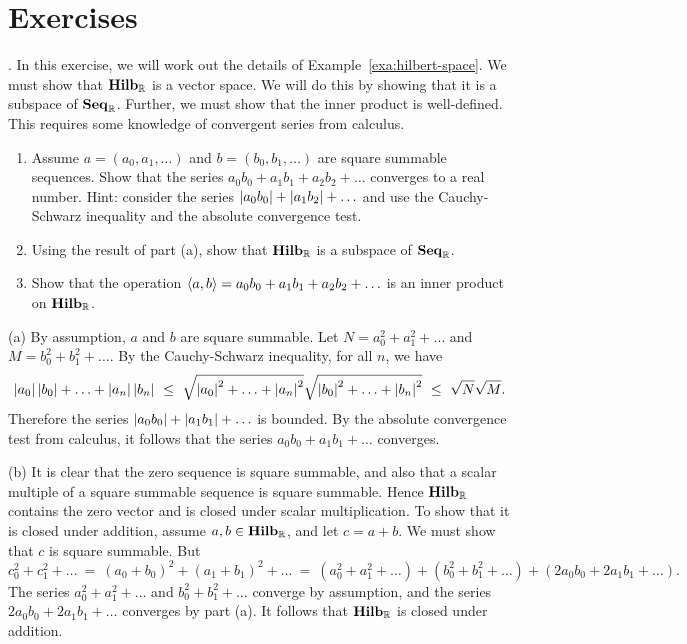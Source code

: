 \section*{Exercises}

\begin{ex}\label{ex:hilbert-space}.
  In this exercise, we will work out the details of
  Example~\ref{exa:hilbert-space}. We must show that $\mathbf{Hilb}_{\mathbb{R}}$ is a
  vector space. We will do this by showing that it is a subspace of
  $\mathbf{Seq}_{\mathbb{R}}$. Further, we must show that the inner product is
  well-defined. This requires some knowledge of convergent series from
  calculus.
  \begin{enumerate}
  \item Assume $a=(a_0,a_1,\ldots)$ and $b=(b_0,b_1,\ldots)$ are
    square summable sequences. Show that the series
    $a_0b_0 + a_1b_1 + a_2b_2 + \ldots$ converges to a real
    number. Hint: consider the series
    $\left|a_0b_0\right| + \left|a_1b_2\right| + \ldots$ and use the Cauchy-Schwarz
    inequality and the absolute convergence test.
  \item Using the result of part (a), show that $\mathbf{Hilb}_{\mathbb{R}}$ is a
    subspace of $\mathbf{Seq}_{\mathbb{R}}$. 
  \item Show that the operation $\langle a,b\rangle = a_0b_0 + a_1b_1 +
    a_2b_2 + \ldots$ is an inner product on $\mathbf{Hilb}_{\mathbb{R}}$.
  \end{enumerate}
  \begin{sol}
    (a) By assumption, $a$ and $b$ are square summable. Let
    $N=a_0^2 + a_1^2 + \ldots$ and $M=b_0^2 + b_1^2 + \ldots$.
    By the Cauchy-Schwarz inequality, for all $n$, we have
    \begin{equation*}
      \left|a_0\right|\left|b_0\right| + \ldots + \left|a_n\right|\left|b_n\right|
      ~\leq~ \sqrt{\left|a_0\right|^2 + \ldots + \left|a_n\right|^2} \sqrt{\left|b_0\right|^2 + \ldots + \left|b_n\right|^2}
      ~\leq~ \sqrt{N}\sqrt{M}.
    \end{equation*}
    Therefore the series $\left|a_0b_0\right| + \left|a_1b_1\right| + \ldots$ is
    bounded. By the absolute convergence test from calculus, it
    follows that the series $a_0b_0 + a_1b_1 + \ldots$ converges.

    (b) It is clear that the zero sequence is square summable, and
    also that a scalar multiple of a square summable sequence is
    square summable. Hence $\mathbf{Hilb}_{\mathbb{R}}$ contains the zero vector and
    is closed under scalar multiplication. To show that it is closed
    under addition, assume $a,b\in\mathbf{Hilb}_{\mathbb{R}}$, and let $c=a+b$. We
    must show that $c$ is square summable. But
    \begin{equation*}
      c_0^2 + c_1^2 + \ldots
      ~=~
      (a_0+b_0)^2 + (a_1+b_1)^2 + \ldots
      ~=~ (a_0^2 + a_1^2 + \ldots) + (b_0^2 + b_1^2 + \ldots)
      + (2a_0b_0 + 2a_1b_1 + \ldots).
    \end{equation*}
    The series $a_0^2 + a_1^2 + \ldots$ and $b_0^2 + b_1^2 + \ldots$
    converge by assumption, and the series $2a_0b_0 + 2a_1b_1 +
    \ldots$ converges by part (a). It follows that $\mathbf{Hilb}_{\mathbb{R}}$ is
    closed under addition.


\end{sol}
\end{ex}
